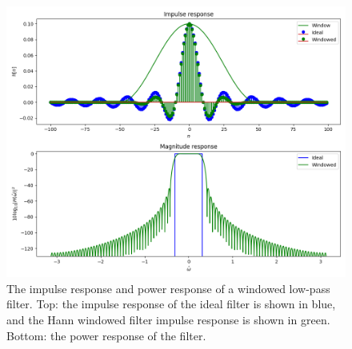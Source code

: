 \begin{figure}
  \begin{center}
    \includegraphics[width=\textwidth]{code/022_window_functions/windowed_lpf.png}
  \end{center}
  \caption{The impulse response and power response of a windowed
    low-pass filter. Top: the impulse response of the ideal filter is
    shown in blue, and the Hann windowed filter impulse response is
    shown in green. Bottom: the power response of the filter.}
  \label{fig:lpf_hann}
\end{figure}




